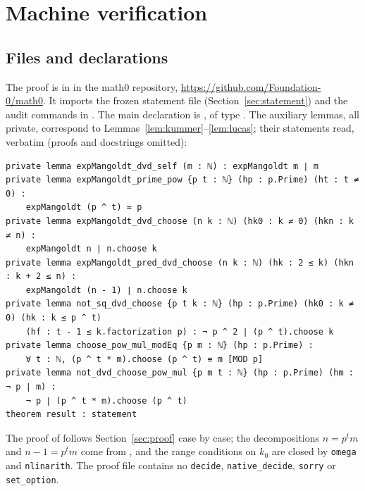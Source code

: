 \documentclass[11pt]{amsart}
\theoremstyle{plain}
\theoremstyle{definition}
\begin{document}
\section{Machine verification}\label{sec:lean}

\subsection*{Files and declarations}
The proof is in  in the math0 repository, \url{https://github.com/Foundation-0/math0}. It imports the frozen statement file  (Section~\ref{sec:statement}) and the audit commands in . The main declaration is , of type . The auxiliary lemmas, all private, correspond to Lemmas~\ref{lem:kummer}--\ref{lem:lucas}; their statements read, verbatim (proofs and docstrings omitted):
\begin{lstlisting}
private lemma expMangoldt_dvd_self (m : ℕ) : expMangoldt m ∣ m
private lemma expMangoldt_prime_pow {p t : ℕ} (hp : p.Prime) (ht : t ≠ 0) :
    expMangoldt (p ^ t) = p
private lemma expMangoldt_dvd_choose (n k : ℕ) (hk0 : k ≠ 0) (hkn : k ≠ n) :
    expMangoldt n ∣ n.choose k
private lemma expMangoldt_pred_dvd_choose (n k : ℕ) (hk : 2 ≤ k) (hkn : k + 2 ≤ n) :
    expMangoldt (n - 1) ∣ n.choose k
private lemma not_sq_dvd_choose {p t k : ℕ} (hp : p.Prime) (hk0 : k ≠ 0) (hk : k ≤ p ^ t)
    (hf : t - 1 ≤ k.factorization p) : ¬ p ^ 2 ∣ (p ^ t).choose k
private lemma choose_pow_mul_modEq {p m : ℕ} (hp : p.Prime) :
    ∀ t : ℕ, (p ^ t * m).choose (p ^ t) ≡ m [MOD p]
private lemma not_dvd_choose_pow_mul {p m t : ℕ} (hp : p.Prime) (hm : ¬ p ∣ m) :
    ¬ p ∣ (p ^ t * m).choose (p ^ t)
theorem result : statement
\end{lstlisting}
The proof of  follows Section~\ref{sec:proof} case by case; the decompositions $n=p^tm$ and $n-1=p^tm$ come from , and the range conditions on $k_0$ are closed by \texttt{omega} and \texttt{nlinarith}. The proof file contains no \texttt{decide}, \texttt{native\_decide}, \texttt{sorry} or \texttt{set\_option}.
\end{document}
